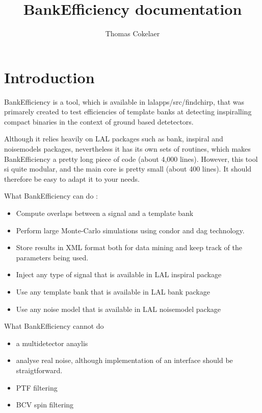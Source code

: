 \documentclass[a4paper,10pt]{article}
\title{BankEfficiency documentation}
\author{Thomas Cokelaer}
\begin{document}

\pagestyle{plain}
\rfoot{}
\lfoot{}
\pagestyle{plain}



\maketitle
\section{Introduction}

BankEfficiency is a tool, which is available in lalapps/src/findchirp, that was primarely created to test efficiencies of template banks at detecting inspiralling compact binaries in the context of ground based detetectors. 

Although it relies heavily on LAL packages such as bank, inspiral and noisemodels packages, nevertheless it has its own sets of routines, which makes BankEfficiency a pretty long piece of code (about 4,000 lines). However, this tool si quite modular, and the main core is pretty small (about 400 lines). It should therefore be easy to adapt it to your needs. 

What BankEfficiency can do :
\begin{itemize}
 \item Compute overlaps between a signal and a template bank
 \item Perform large Monte-Carlo simulations using condor and dag technology.
 \item Store results in XML format both for data mining and keep track of the parameters being used.
 \item Inject any type of signal that is available in LAL inspiral package
 \item Use any template bank that is available in LAL bank package
 \item Use any noise model that is available in LAL noisemodel package
\end{itemize}

What BankEfficiency cannot do
\begin{itemize}
 \item a multidetector anaylis
 \item analyse real noise, although implementation of an interface should be straigtforward.
 \item PTF filtering
 \item BCV spin filtering
\end{itemize}
\end{document}
